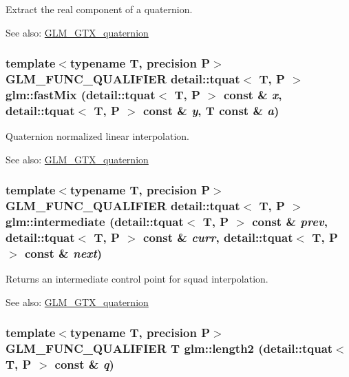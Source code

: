 Extract the real component of a quaternion.

\begin{Desc}
\item[See also:]\hyperlink{group__gtx__quaternion}{GLM\_\-GTX\_\-quaternion} \end{Desc}
\hypertarget{group__gtx__quaternion_g0538872e0a23bc7ba865700756c1a3a7}{
\subsubsection[fastMix]{\setlength{\rightskip}{0pt plus 5cm}template$<$typename T, precision P$>$ GLM\_\-FUNC\_\-QUALIFIER detail::tquat$<$ T, P $>$ glm::fastMix (detail::tquat$<$ T, P $>$ const \& {\em x}, \/  detail::tquat$<$ T, P $>$ const \& {\em y}, \/  T const \& {\em a})}}
\label{group__gtx__quaternion_g0538872e0a23bc7ba865700756c1a3a7}


Quaternion normalized linear interpolation.

\begin{Desc}
\item[See also:]\hyperlink{group__gtx__quaternion}{GLM\_\-GTX\_\-quaternion} \end{Desc}
\hypertarget{group__gtx__quaternion_ge94a070898e8be560a5dcf8e15854b2d}{
\subsubsection[intermediate]{\setlength{\rightskip}{0pt plus 5cm}template$<$typename T, precision P$>$ GLM\_\-FUNC\_\-QUALIFIER detail::tquat$<$ T, P $>$ glm::intermediate (detail::tquat$<$ T, P $>$ const \& {\em prev}, \/  detail::tquat$<$ T, P $>$ const \& {\em curr}, \/  detail::tquat$<$ T, P $>$ const \& {\em next})}}
\label{group__gtx__quaternion_ge94a070898e8be560a5dcf8e15854b2d}


Returns an intermediate control point for squad interpolation.

\begin{Desc}
\item[See also:]\hyperlink{group__gtx__quaternion}{GLM\_\-GTX\_\-quaternion} \end{Desc}
\hypertarget{group__gtx__quaternion_ge0ff959e757f5feba0bd375658673d0d}{
\subsubsection[length2]{\setlength{\rightskip}{0pt plus 5cm}template$<$typename T, precision P$>$ GLM\_\-FUNC\_\-QUALIFIER T glm::length2 (detail::tquat$<$ T, P $>$ const \& {\em q})}}
\label{group__gtx__quaternion_ge0ff959e757f5feba0bd375658673d0d}


